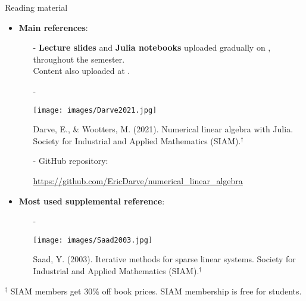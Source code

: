 \documentclass[t,usepdftitle=false]{beamer}
\begin{document}
\begin{frame}{Reading material}
\begin{itemize}
\item \textbf{Main references}:
\begin{itemize}
\item[-] \textbf{Lecture slides} and \textbf{Julia notebooks} uploaded gradually on {}, throughout the semester.\\
Content also uploaded at {}.
\item[-]\begin{minipage}{0.2\textwidth}\vspace{.15cm}
\texttt{[image: images/Darve2021.jpg]}
\end{minipage}
\hspace{-.8cm}
\begin{minipage}{0.75\textwidth}
Darve, E., \& Wootters, M. (2021). Numerical linear algebra with Julia.
Society for Industrial and Applied Mathematics (SIAM).${}^\dagger$
\end{minipage}\vspace{.3cm}
\item[-] GitHub repository: 
\begin{center}\url{https://github.com/EricDarve/numerical_linear_algebra}\end{center}\vspace{.3cm}
\end{itemize}
\item \textbf{Most used supplemental reference}:
\begin{itemize}
\item[-]\begin{minipage}{0.2\textwidth}\vspace{.15cm}
\texttt{[image: images/Saad2003.jpg]}
\end{minipage}
\hspace{-.8cm}
\begin{minipage}{0.75\textwidth}
Saad, Y. (2003). Iterative methods for sparse linear systems. 
Society for Industrial and Applied Mathematics (SIAM).${}^\dagger$
\end{minipage}\vspace{.3cm}
\end{itemize}
\end{itemize}
\vfill
\tiny{${}^\dagger$ SIAM members get 30\% off book prices. SIAM membership is free for students.}
\end{frame}
\end{document}
